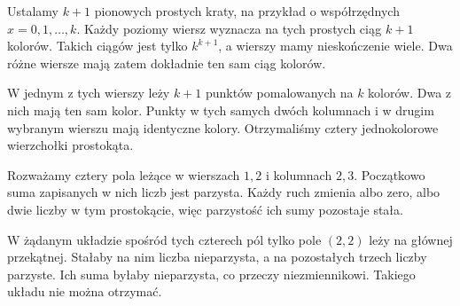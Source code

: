 \documentclass{lecture-kuznia}
\begin{document}
\begin{solution*}[\ref{Z14}]
	Ustalamy $k+1$ pionowych prostych kraty, na przykład o współrzędnych
	$x=0,1,\dots,k$. Każdy poziomy wiersz wyznacza na tych prostych ciąg
	$k+1$ kolorów. Takich ciągów jest tylko $k^{k+1}$, a wierszy mamy
	nieskończenie wiele. Dwa różne wiersze mają zatem dokładnie ten sam ciąg
	kolorów.

	W jednym z tych wierszy leży $k+1$ punktów pomalowanych na $k$ kolorów.
	Dwa z nich mają ten sam kolor. Punkty w tych samych dwóch kolumnach
	i w drugim wybranym wierszu mają identyczne kolory. Otrzymaliśmy cztery
	jednokolorowe wierzchołki prostokąta.
\end{solution*}

\begin{solution*}[\ref{Z15}]
	Rozważamy cztery pola leżące w wierszach $1,2$ i kolumnach $2,3$.
	Początkowo suma zapisanych w nich liczb jest parzysta. Każdy ruch zmienia
	albo zero, albo dwie liczby w tym prostokącie, więc parzystość ich sumy
	pozostaje stała.

	W żądanym układzie spośród tych czterech pól tylko pole $(2,2)$ leży na
	głównej przekątnej. Stałaby na nim liczba nieparzysta, a na pozostałych
	trzech liczby parzyste. Ich suma byłaby nieparzysta, co przeczy
	niezmiennikowi. Takiego układu nie można otrzymać.
\end{solution*}
\fi
\end{document}
